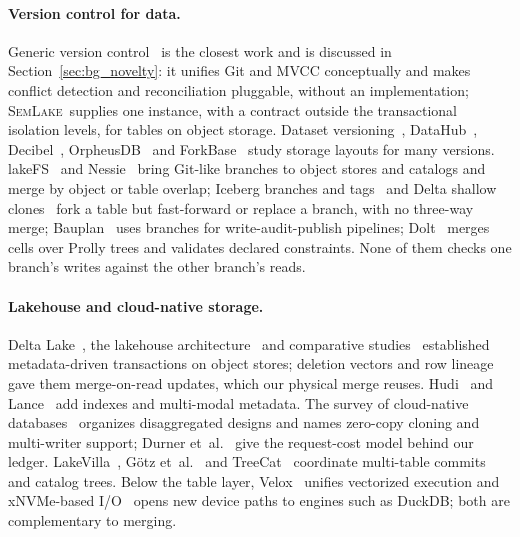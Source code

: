 \documentclass[sigconf, nonacm]{acmart}
\newcommand{\systemname}{\textsc{SemLake}}
\begin{document}
\paragraph{Version control for data.}
Generic version control~\cite{yilmaz2025gvc} is the closest work and is discussed in Section~\ref{sec:bg_novelty}: it unifies Git and MVCC conceptually and makes conflict detection and reconciliation pluggable, without an implementation; \systemname\ supplies one instance, with a contract outside the transactional isolation levels, for tables on object storage. Dataset versioning~\cite{bhattacherjee2015principles}, DataHub~\cite{bhardwaj2015datahub}, Decibel~\cite{maddox2016decibel}, OrpheusDB~\cite{huang2017orpheusdb} and ForkBase~\cite{wang2018forkbase} study storage layouts for many versions. lakeFS~\cite{lakefs} and Nessie~\cite{nessie} bring Git-like branches to object stores and catalogs and merge by object or table overlap; Iceberg branches and tags~\cite{icebergbranching} and Delta shallow clones~\cite{deltaclone} fork a table but fast-forward or replace a branch, with no three-way merge; Bauplan~\cite{tagliabue2024bauplan} uses branches for write-audit-publish pipelines; Dolt~\cite{dolt2026} merges cells over Prolly trees and validates declared constraints. None of them checks one branch's writes against the other branch's reads.

\paragraph{Lakehouse and cloud-native storage.}
Delta Lake~\cite{armbrust2020delta}, the lakehouse architecture~\cite{zaharia2021lakehouse} and comparative studies~\cite{jain2023analyzing, camacho2024lstbench, harby2025survey} established metadata-driven transactions on object stores; deletion vectors and row lineage~\cite{okolnychyi2024petabyte, iceberg2025v3, delta2024rowlevel} gave them merge-on-read updates, which our physical merge reuses. Hudi~\cite{sumit2026hudi} and Lance~\cite{lance2025} add indexes and multi-modal metadata. The survey of cloud-native databases~\cite{dong2024cloudnative} organizes disaggregated designs and names zero-copy cloning and multi-writer support; Durner et~al.~\cite{durner2023exploiting} give the request-cost model behind our ledger. LakeVilla~\cite{gotz2025lakevilla}, G\"otz et~al.~\cite{gotz2026interoperable} and TreeCat~\cite{oh2025treecat} coordinate multi-table commits and catalog trees. Below the table layer, Velox~\cite{pedreira2022velox} unifies vectorized execution and xNVMe-based I/O~\cite{houlborg2026xnvme} opens new device paths to engines such as DuckDB; both are complementary to merging.
\end{document}
